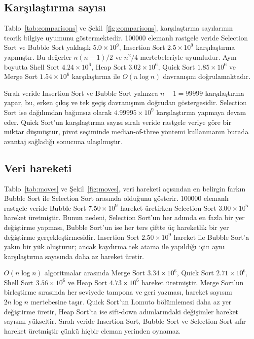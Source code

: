 \documentclass[12pt,a4paper]{article}
\begin{document}
\subsection{Karşılaştırma sayısı}

Tablo~\ref{tab:comparisons} ve Şekil~\ref{fig:comparisons}, karşılaştırma
sayılarının teorik bilgiye uyumunu göstermektedir. 100000 elemanlı
rastgele veride Selection Sort ve Bubble Sort yaklaşık $5.0 \times 10^9$,
Insertion Sort $2.5 \times 10^9$ karşılaştırma yapmıştır. Bu değerler
$n(n-1)/2$ ve $n^2/4$ mertebeleriyle uyumludur. Aynı boyutta Shell Sort
$4.24 \times 10^6$, Heap Sort $3.02 \times 10^6$, Quick Sort
$1.85 \times 10^6$ ve Merge Sort $1.54 \times 10^6$ karşılaştırma ile
$O(n \log n)$ davranışını doğrulamaktadır.



Sıralı veride Insertion Sort ve Bubble Sort yalnızca $n-1 = 99999$
karşılaştırma yapar, bu, erken çıkış ve tek geçiş davranışının doğrudan
göstergesidir. Selection Sort ise dağılımdan bağımsız olarak
$4.99995 \times 10^9$ karşılaştırma yapmaya devam eder. Quick Sort'un
karşılaştırma sayısı sıralı veride rastgele veriye göre bir miktar düşmüştür,
pivot seçiminde median-of-three yöntemi kullanmanın burada avantaj sağladığı
sonucuna ulaşılmıştır.

\subsection{Veri hareketi}

Tablo~\ref{tab:moves} ve Şekil~\ref{fig:moves}, veri hareketi açısından en
belirgin farkın Bubble Sort ile Selection Sort arasında olduğunu gösterir.
100000 elemanlı rastgele veride Bubble Sort $7.50 \times 10^9$ hareket
üretirken Selection Sort $3.00 \times 10^5$ hareket üretmiştir. Bunun nedeni,
Selection Sort'un her adımda en fazla bir yer değiştirme yapması, Bubble Sort'un
ise her ters çiftte üç hareketlik bir yer değiştirme gerçekleştirmesidir.
Insertion Sort $2.50 \times 10^9$ hareket ile Bubble Sort'a yakın bir yük
oluşturur; ancak kaydırma tek atama ile yapıldığı için aynı karşılaştırma
sayısında daha az hareket üretir.



$O(n \log n)$ algoritmalar arasında Merge Sort $3.34 \times 10^6$, Quick Sort
$2.71 \times 10^6$, Shell Sort $3.56 \times 10^6$ ve Heap Sort
$4.73 \times 10^6$ hareket üretmiştir. Merge Sort'un birleştirme sırasında her
seviyede tampona ve geri yazması, hareket sayısını $2n \log n$ mertebesine
taşır. Quick Sort'un Lomuto bölümlemesi daha az yer değiştirme üretir, Heap
Sort'ta ise sift-down adımlarındaki değişimler hareket sayısını yükseltir.
Sıralı veride Insertion Sort, Bubble Sort ve Selection Sort sıfır hareket
üretmiştir çünkü hiçbir eleman yerinden oynamaz.
\end{document}
